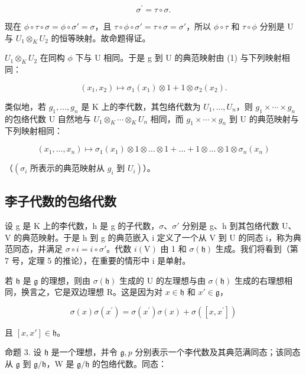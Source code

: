 \[
\sigma^ {\prime} = \tau \circ \sigma .\tag{1}
\]

现在 \(\phi \circ \tau \circ \sigma = \phi \circ \sigma' = \sigma\)，且 \(\tau \circ \phi \circ \sigma' = \tau \circ \sigma = \sigma'\)，所以 \(\phi \circ \tau\) 和 \(\tau \circ \phi\) 分别是 U 与 \(U_1 \otimes_K U_2\) 的恒等映射。故命题得证。

\(U_{1} \otimes_{K} U_{2}\) 在同构 \(\phi\) 下与 U 相同。于是 g 到 U 的典范映射由 (1) 与下列映射相同：

\[
(x _ {1}, x _ {2}) \mapsto \sigma_ {1} (x _ {1}) \otimes 1 + 1 \otimes \sigma_ {2} (x _ {2}).
\]

类似地，若 \(g_{1},\ldots,g_{n}\) 是 K 上的李代数，其包络代数为 \(U_{1},\ldots,U_{n}\)，则 \(g_{1}\times\cdots\times g_{n}\) 的包络代数 U 自然地与 \(U_{1}\otimes_{K}\cdots\otimes_{K}U_{n}\) 相同，而 \(g_{1}\times\cdots\times g_{n}\) 到 U 的典范映射与下列映射相同：

\[
(x _ {1}, \dots , x _ {n}) \mapsto \sigma_ {1} (x _ {1}) \otimes 1 \otimes \dots \otimes 1 + \dots + 1 \otimes \dots \otimes 1 \otimes \sigma_ {n} (x _ {n})
\]

（\((\sigma_{i} \text{ 所表示的典范映射从 } g_{i} \text{ 到 } U_{i})\)）。

\subsection{李子代数的包络代数}

设 g 是 K 上的李代数，h 是 g 的子代数，\(\sigma\)、\(\sigma'\) 分别是 g、h 到其包络代数 U、V 的典范映射。于是 h 到 g 的典范嵌入 i 定义了一个从 V 到 U 的同态 i，称为典范同态，并满足 \(\sigma \circ i = i \circ \sigma'\)。代数 \(i(\mathrm{V})\) 由 1 和 \(\sigma(\mathfrak{h})\) 生成。我们将看到（第 7 号，定理 5 的推论），在重要的情形中 i 是单射。

若 \(\mathfrak{h}\) 是 \(\mathfrak{g}\) 的理想，则由 \(\sigma(\mathfrak{h})\) 生成的 U 的左理想与由 \(\sigma(\mathfrak{h})\) 生成的右理想相同，换言之，它是双边理想 R。这是因为对 \(x \in \mathfrak{h}\) 和 \(x' \in \mathfrak{g}\)，

\[
\sigma (x) \sigma (x ^ {\prime}) = \sigma (x ^ {\prime}) \sigma (x) + \sigma ([ x, x ^ {\prime} ])
\]

且 \([x, x'] \in \mathfrak{h}\)。

命题 3. 设 \(\mathfrak{h}\) 是一个理想，并令 \(\mathfrak{g}, p\) 分别表示一个李代数及其典范满同态；该同态从 \(\mathfrak{g}\) 到 \(\mathfrak{g} / \mathfrak{h}\)，W 是 \(\mathfrak{g} / \mathfrak{h}\) 的包络代数。同态：

